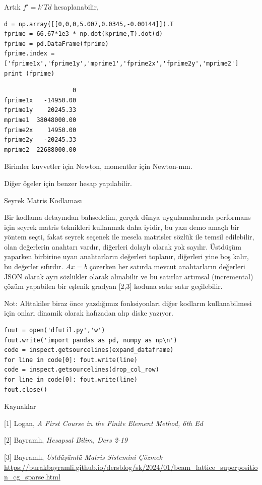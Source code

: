 \documentclass[12pt,fleqn]{article}\usepackage{../../common}
\begin{document}
Artık $f' = k' T d$ hesaplanabilir,

\begin{verbatim}
d = np.array([[0,0,0,5.007,0.0345,-0.00144]]).T
fprime = 66.67*1e3 * np.dot(kprime,T).dot(d)
fprime = pd.DataFrame(fprime)
fprime.index = ['fprime1x','fprime1y','mprime1','fprime2x','fprime2y','mprime2']
print (fprime)
\end{verbatim}

\begin{verbatim}
                   0
fprime1x   -14950.00
fprime1y    20245.33
mprime1  38048000.00
fprime2x    14950.00
fprime2y   -20245.33
mprime2  22688000.00
\end{verbatim}

Birimler kuvvetler için Newton, momentler için Newton-mm.

Diğer ögeler için benzer hesap yapılabilir.

Seyrek Matris Kodlaması

Bir kodlama detayından bahsedelim, gerçek dünya uygulamalarında performans için
seyrek matris teknikleri kullanmak daha iyidir, bu yazı demo amaçlı bir yöntem
seçti, fakat seyrek seçenek ile mesela matrisler sözlük ile temsil edilebilir,
olan değerlerin anahtarı vardır, diğerleri dolaylı olarak yok sayılır. Üstdüşüm
yaparken birbirine uyan anahtarların değerleri toplanır, diğerleri yine boş
kalır, bu değerler sıfırdır. $Ax=b$ çözerken her satırda mevcut anahtarların
değerleri JSON olarak ayrı sözlükler olarak alınabilir ve bu satırlar artımsal
(incremental) çözüm yapabilen bir eşlenik gradyan [2,3] koduna satır satır
geçilebilir.

Not: Alttakiler biraz önce yazdığımız fonksiyonları diğer kodların
kullanabilmesi için onları dinamik olarak hafızadan alıp diske yazıyor.

\begin{verbatim}
fout = open('dfutil.py','w')
fout.write('import pandas as pd, numpy as np\n')
code = inspect.getsourcelines(expand_dataframe)
for line in code[0]: fout.write(line)
code = inspect.getsourcelines(drop_col_row)
for line in code[0]: fout.write(line)
fout.close()
\end{verbatim}

Kaynaklar

[1] Logan, {\em A First Course in the Finite Element Method, 6th Ed}

[2] Bayramlı, {\em Hesapsal Bilim, Ders 2-19}

[3] Bayramlı, {\em Üstdüşümlü Matris Sistemini Çözmek}
    \url{https://burakbayramli.github.io/dersblog/sk/2024/01/beam_lattice_superposition_cg_sparse.html}
\end{document}
